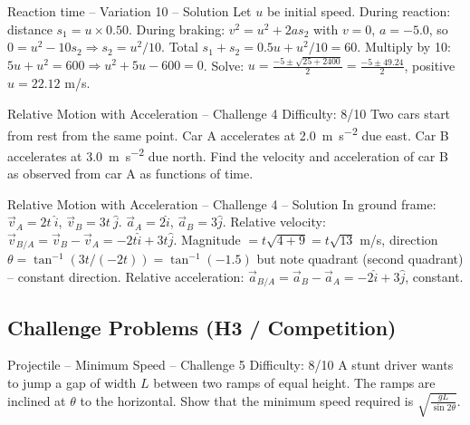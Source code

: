 \documentclass{beamer}
\begin{document}
\begin{frame}[shrink=15]{Reaction time – Variation 10 – Solution}
Let $u$ be initial speed. During reaction: distance $s_1 = u \times 0.50$.
During braking: $v^2 = u^2 + 2a s_2$ with $v=0$, $a=-5.0$, so $0 = u^2 - 10 s_2 \Rightarrow s_2 = u^2/10$.
Total $s_1+s_2 = 0.5u + u^2/10 = 60$.
Multiply by 10: $5u + u^2 = 600 \Rightarrow u^2 + 5u -600 = 0$.
Solve: $u = \frac{-5 \pm \sqrt{25+2400}}{2} = \frac{-5 \pm 49.24}{2}$, positive $u = 22.12$ m/s.
\end{frame}

\begin{frame}[t,shrink=15]{Relative Motion with Acceleration – Challenge 4 \hfill Difficulty: 8/10}
Two cars start from rest from the same point. Car A accelerates at \SI{2.0}{\meter\per\second\squared} due east. Car B accelerates at \SI{3.0}{\meter\per\second\squared} due north. Find the velocity and acceleration of car B as observed from car A as functions of time.
\end{frame}

\begin{frame}[shrink=15]{Relative Motion with Acceleration – Challenge 4 – Solution}
In ground frame: $\vec{v}_A = 2t \ \hat{i}$, $\vec{v}_B = 3t \ \hat{j}$. $\vec{a}_A = 2\hat{i}$, $\vec{a}_B = 3\hat{j}$.
Relative velocity: $\vec{v}_{B/A} = \vec{v}_B - \vec{v}_A = -2t \hat{i} + 3t \hat{j}$.
Magnitude $= t\sqrt{4+9} = t\sqrt{13}$ m/s, direction $\theta = \tan^{-1}(3t / (-2t)) = \tan^{-1}(-1.5)$ but note quadrant (second quadrant) – constant direction.
Relative acceleration: $\vec{a}_{B/A} = \vec{a}_B - \vec{a}_A = -2\hat{i} + 3\hat{j}$, constant.
\end{frame}


\subsection{Challenge Problems (H3 / Competition)}

\begin{frame}[t,shrink=15]{Projectile – Minimum Speed – Challenge 5 \hfill Difficulty: 8/10}
A stunt driver wants to jump a gap of width $L$ between two ramps of equal height. The ramps are inclined at $\theta$ to the horizontal. Show that the minimum speed required is $\sqrt{\frac{gL}{\sin 2\theta}}$.
\end{frame}
\end{document}
